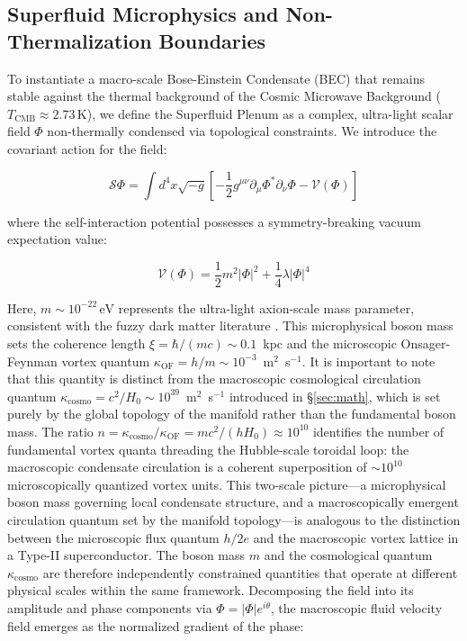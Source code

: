 \documentclass[aps,prd,10pt,twocolumn,superscriptaddress,nofootinbib]{revtex4-2}
\begin{document}
\subsection{\label{sec:microphysics}Superfluid Microphysics and Non-Thermalization Boundaries}

To instantiate a macro-scale Bose-Einstein Condensate (BEC) that remains stable against the thermal background of the Cosmic Microwave Background ($T_{\text{CMB}} \approx 2.73\,\text{K}$), we define the Superfluid Plenum as a complex, ultra-light scalar field $\Phi$ non-thermally condensed via topological constraints. We introduce the covariant action for the field:

\begin{equation}
\mathcal{S}\Phi = \int d^4x \sqrt{-g} \left[ -\frac{1}{2} g^{\mu\nu} \partial_\mu \Phi^* \partial_\nu \Phi - \mathcal{V}(\Phi) \right]
\end{equation}

where the self-interaction potential possesses a symmetry-breaking vacuum expectation value:

\begin{equation}
\mathcal{V}(\Phi) = \frac{1}{2} m^2 |\Phi|^2 + \frac{1}{4} \lambda |\Phi|^4
\end{equation}

Here, $m \sim 10^{-22}\,\text{eV}$ represents the ultra-light axion-scale mass parameter, consistent with the fuzzy dark matter literature \cite{hui_ultralight}. This microphysical boson mass sets the coherence length $\xi = \hbar/(mc) \sim 0.1$~kpc and the microscopic Onsager-Feynman vortex quantum $\kappa_{\text{OF}} = h/m \sim 10^{-3}$~m$^2$~s$^{-1}$. It is important to note that this quantity is distinct from the macroscopic cosmological circulation quantum $\kappa_{\text{cosmo}} = c^2/H_0 \sim 10^{39}$~m$^2$~s$^{-1}$ introduced in \S\ref{sec:math}, which is set purely by the global topology of the manifold rather than the fundamental boson mass. The ratio $n = \kappa_{\text{cosmo}}/\kappa_{\text{OF}} = mc^2/(hH_0) \approx 10^{10}$ identifies the number of fundamental vortex quanta threading the Hubble-scale toroidal loop: the macroscopic condensate circulation is a coherent superposition of $\sim 10^{10}$ microscopically quantized vortex units. This two-scale picture---a microphysical boson mass governing local condensate structure, and a macroscopically emergent circulation quantum set by the manifold topology---is analogous to the distinction between the microscopic flux quantum $h/2e$ and the macroscopic vortex lattice in a Type-II superconductor. The boson mass $m$ and the cosmological quantum $\kappa_{\text{cosmo}}$ are therefore independently constrained quantities that operate at different physical scales within the same framework. Decomposing the field into its amplitude and phase components via $\Phi = |\Phi|e^{i\theta}$, the macroscopic fluid velocity field emerges as the normalized gradient of the phase:
\end{document}
